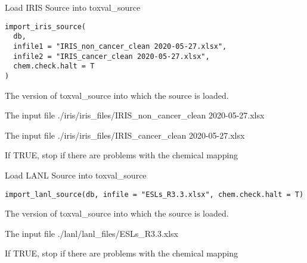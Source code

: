 \documentclass[letterpaper]{book}
\begin{document}
%
\begin{Description}\relax
Load IRIS Source into toxval\_source
\end{Description}
%
\begin{Usage}
\begin{verbatim}
import_iris_source(
  db,
  infile1 = "IRIS_non_cancer_clean 2020-05-27.xlsx",
  infile2 = "IRIS_cancer_clean 2020-05-27.xlsx",
  chem.check.halt = T
)
\end{verbatim}
\end{Usage}
%
\begin{Arguments}
\begin{ldescription}
\item[\code{db}] The version of toxval\_source into which the source is loaded.

\item[\code{infile1}] The input file ./iris/iris\_files/IRIS\_non\_cancer\_clean 2020-05-27.xlsx

\item[\code{infile2}] The input file ./iris/iris\_files/IRIS\_cancer\_clean 2020-05-27.xlsx

\item[\code{chem.check.halt}] If TRUE, stop if there are problems with the chemical mapping
\end{ldescription}
\end{Arguments}
%
\begin{Description}\relax
Load LANL Source into toxval\_source
\end{Description}
%
\begin{Usage}
\begin{verbatim}
import_lanl_source(db, infile = "ESLs_R3.3.xlsx", chem.check.halt = T)
\end{verbatim}
\end{Usage}
%
\begin{Arguments}
\begin{ldescription}
\item[\code{db}] The version of toxval\_source into which the source is loaded.

\item[\code{infile}] The input file ./lanl/lanl\_files/ESLs\_R3.3.xlsx

\item[\code{chem.check.halt}] If TRUE, stop if there are problems with the chemical mapping
\end{ldescription}
\end{Arguments}
\end{document}

